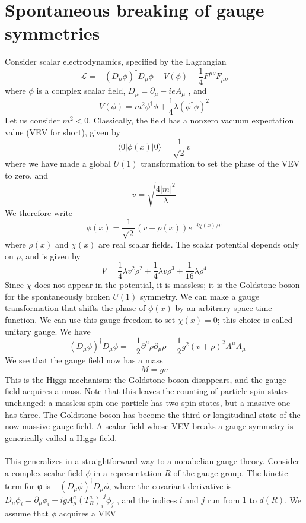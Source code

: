 \documentclass[cyan]{elegantnote}
\begin{document}
\section{Spontaneous breaking of gauge symmetries}
Consider scalar electrodynamics, specified by the Lagrangian
\[\mathcal{L} = -(D_{\mu}\phi)^{\dagger}D_{\mu}\phi - V(\phi) - \frac{1}{4}F^{\mu\nu}F_{\mu\nu}\]
where $\phi$ is a complex scalar field, $D_{\mu} = \partial_{\mu} - ieA_{\mu}$ , and
\[V(\phi) = m^2\phi^{\dagger}\phi + \frac{1}{4}\lambda (\phi^{\dagger}\phi)^2\]
Let us consider $m^2 < 0$. Classically, the field has a nonzero vacuum expectation value (VEV for short), given by
\[\langle 0 | \phi(x) | 0 \rangle = \frac{1}{\sqrt{2}}v\]
where we have made a global $U(1)$ transformation to set the phase of the VEV to zero, and
\[v = \sqrt{\frac{4|m|^2}{\lambda}}\]
We therefore write
\[\phi(x) = \frac{1}{\sqrt{2}} (v + \rho(x)) e^{-i\chi(x)/v}\]
where $\rho(x)$ and $\chi(x)$ are real scalar fields. The scalar potential depends only on $\rho$, and is given by
\[V = \frac{1}{4}\lambda v^2\rho^2 + \frac{1}{4}\lambda v \rho^3 + \frac{1}{16}\lambda \rho^4\]
Since $\chi$ does not appear in the potential, it is massless; it is the Goldstone boson for the spontaneously broken $U(1)$ symmetry.
We can make a gauge transformation that shifts the phase of $\phi(x)$ by an arbitrary space-time function.
We can use this gauge freedom to set $\chi(x) = 0$; this choice is called unitary gauge.
We have
\[-(D_{\mu}\phi)^{\dagger}D_{\mu}\phi = -\frac{1}{2}\partial^{\mu}\rho \partial_{\mu}\rho - \frac{1}{2}g^2(v+\rho)^2 A^{\mu}A_{\mu}\]
We see that the gauge field now has a mass
\[M = gv\]
This is the Higgs mechanism: the Goldstone boson disappears, and the gauge field acquires a mass. Note that this leaves the counting of particle spin states unchanged: a massless spin-one particle has two spin states, but a massive
one has three. The Goldstone boson has become the third or longitudinal state of the now-massive gauge field. A scalar field whose VEV breaks a gauge symmetry is generically called a Higgs field.
\\ \\
This generalizes in a straightforward way to a nonabelian gauge theory. Consider a complex scalar field $\phi$ in a representation $R$ of the gauge group.
The kinetic term for φ is $-(D_{\mu}\phi)^{\dagger}D_{\mu}\phi$, where the covariant derivative is $D_{\mu}\phi_i = \partial_{\mu}\phi_i - igA^a_{\mu}(T^a_R)_{i}^{\phantom{i}j} \phi_j$ , and the indices $i$ and $j$ run from $1$ to $d(R)$.
We assume that $\phi$ acquires a VEV
\end{document}
